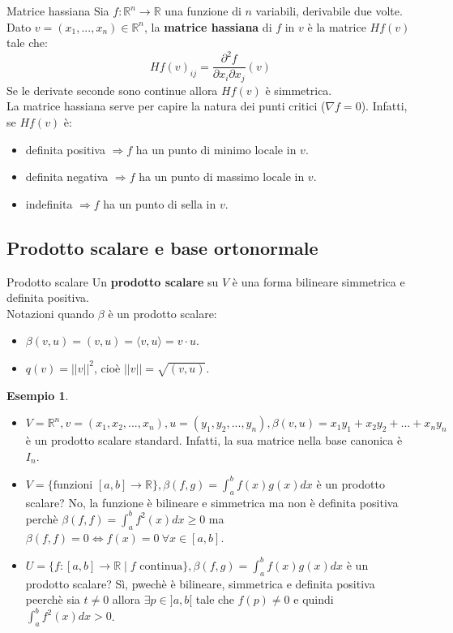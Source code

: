 \documentclass[a4paper]{article}
\theoremstyle{definition}
\newtheorem*{es}{Esempio}
\begin{document}
	\begin{deff}{Matrice hassiana}{}
		Sia $f: \mathbb{R}^n \to \mathbb{R}$ una funzione di $n$ variabili, derivabile due volte. \\
		Dato $v = (x_1, ..., x_n) \in \mathbb{R}^n$, la \textbf{matrice hassiana} di $f$ in $v$ è la matrice $Hf(v)$ tale che:
		\[ {Hf(v)}_{ij} = \frac{\partial^2 f}{\partial x_i \partial x_j}(v) \]
		Se le derivate seconde sono continue allora $Hf(v)$ è simmetrica. \\
		La matrice hassiana serve per capire la natura dei punti critici ($\nabla f = 0$). Infatti, se $Hf(v)$ è:
		\begin{itemize}
			\item definita positiva $\Rightarrow f$ ha un punto di minimo locale in $v$.
			\item definita negativa $\Rightarrow f$ ha un punto di massimo locale in $v$.
			\item indefinita $\Rightarrow f$ ha un punto di sella in $v$.
		\end{itemize}
	\end{deff}

	\subsection{Prodotto scalare e base ortonormale}

	\begin{deff}{Prodotto scalare}{}
		Un \textbf{prodotto scalare} su $V$ è una forma bilineare simmetrica e definita positiva. \\
		Notazioni quando $\beta$ è un prodotto scalare:
		\begin{itemize}
			\item $\beta(v, u) = (v, u) = \langle v, u \rangle = v \cdot u$.
			\item $q(v) = ||v||^2$, cioè $||v|| = \sqrt{(v, u)}$.
		\end{itemize}
	\end{deff}

	\begin{es}
		\begin{itemize}
			\item $V = \mathbb{R}^n, v = (x_1, x_2, ..., x_n), u = (y_1, y_2, ..., y_n), \beta(v, u) = x_1y_1 + x_2y_2 + ... + x_ny_n$ è un prodotto scalare standard.
			Infatti, la sua matrice nella base canonica è $I_n$.
			\item $V = \{\text{funzioni } [a, b] \to \mathbb{R}\}, \beta(f, g) = \int_a^b f(x)g(x)dx$ è un prodotto scalare?
			No, la funzione è bilineare e simmetrica ma non è definita positiva perchè $\beta(f, f) = \int_a^b f^2(x)dx \ge 0$ ma $\beta(f, f) = 0 \Leftrightarrow f(x) = 0 \ \forall x \in [a, b]$.
			\item $U = \{f: [a, b] \to \mathbb{R} \mid f \text{ continua}\}, \beta(f, g) = \int_a^b f(x)g(x)dx$ è un prodotto scalare?
			Sì, pwechè è bilineare, simmetrica e definita positiva peerchè sia $t \ne 0$ allora $\exists p \in ]a, b[$ tale che $f(p) \ne 0$ e quindi $\int_a^b f^2(x)dx > 0$.
		\end{itemize}
	\end{es}
\end{document}
